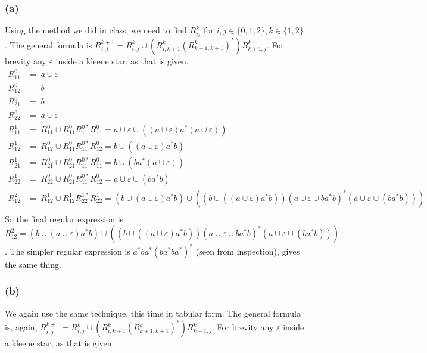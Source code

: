 \documentclass[english]{article}
\begin{document}
\subsubsection*{(a)}
Using the method we did in class, we need to find $R_{ij}^k$ for $i,j \in \{0,1,2\}, k \in \{1,2\}$. The general formula is
$ R_{i,j}^{k+1} = R_{i,j}^{k} \cup (R_{i,k+1}^{k} (R_{k+1,k+1}^{k})^{*}) R_{k+1,j}^{k} $. For brevity any $\varepsilon$ inside a kleene star, as that is given.
\begin{align*}
R_{11}^{0} &=\; a\cup\varepsilon \\
R_{12}^{0} &=\; b \\
R_{21}^{0} &=\; b \\
R_{22}^{0} &=\; a\cup\varepsilon \\
R_{11}^{1} &=\; R_{11}^0 \cup R_{11}^0 R_{11}^{0*} R_{11}^0 = a\cup\varepsilon \cup ((a\cup\varepsilon) a^{*} (a\cup\varepsilon)) \\
R_{12}^{1} &=\; R_{12}^0 \cup R_{11}^0 R_{11}^{0*} R_{12}^0 = b \cup ((a\cup\varepsilon) a^{*} b) \\
R_{21}^{1} &=\; R_{21}^0 \cup R_{21}^0 R_{11}^{0*} R_{11}^0 = b \cup (b a^{*} (a\cup\varepsilon)) \\
R_{22}^{1} &=\; R_{22}^0 \cup R_{21}^0 R_{11}^{0*} R_{12}^0 = a\cup\varepsilon \cup (b a^{*} b) \\
R_{12}^{2} &=\; R_{12}^1 \cup R_{12}^1 R_{22}^{1*} R_{22}^1 = (b \cup (a\cup\varepsilon) a^{*} b) \cup ((b \cup ((a\cup\varepsilon) a^{*} b)) (a\cup\varepsilon \cup b a^{*} b)^{*} (a\cup\varepsilon \cup (b a^{*} b))) \\
\end{align*}
So the final regular expression is $R_{12}^{2} = (b \cup (a\cup\varepsilon) a^{*} b) \cup ((b \cup ((a\cup\varepsilon) a^{*} b)) (a\cup\varepsilon \cup b a^{*} b)^{*} (a\cup\varepsilon \cup (b a^{*} b)))$. The simpler regular expression is $a^{*} b a^{*} (b a^{*} b a^{*})^{*}$ (seen from inspection), gives the same thing.

\subsubsection*{(b)}
We again use the same technique, this time in tabular form. The general formula is, again, 
$ R_{i,j}^{k+1} = R_{i,j}^{k} \cup (R_{i,k+1}^{k} (R_{k+1,k+1}^{k})^{*}) R_{k+1,j}^{k} $. For brevity any $\varepsilon$ inside a kleene star, as that is given.
\end{document}
